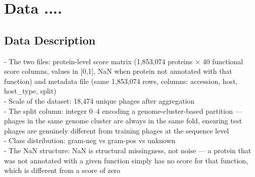 \section{Data ....}

\subsection{Data Description}
\noindent - The two files: protein-level score matrix (1,853,074 proteins × 40 functional score columns, values in [0,1], NaN when protein not annotated with that function) and metadata file (same 1,853,074 rows, columns: accession, host, host\_type, split)\\
- Scale of the dataset: 18,474 unique phages after aggregation\\
- The split column: integer 0–4 encoding a genome-cluster-based partition — phages in the same genome cluster are always in the same fold, ensuring test phages are genuinely different from training phages at the sequence level\\
- Class distribution: gram-neg vs gram-pos vs unknown\\ 
- The NaN structure:  NaN is structural missingness, not noise — a protein that was not annotated with a given function simply has no score for that function, which is different from a score of zero